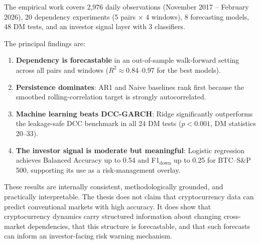 \documentclass[12pt, a4paper]{article}
\begin{document}
The empirical work covers 2{,}976 daily observations
(November 2017 – February 2026), 20 dependency experiments
(5 pairs $\times$ 4 windows), 8 forecasting models, 48 DM tests,
and an investor signal layer with 3 classifiers.

The principal findings are:

\begin{enumerate}
  \item \textbf{Dependency is forecastable} in an out-of-sample
    walk-forward setting across all pairs and windows
    ($R^2 \approx 0.84$–$0.97$ for the best models).
  \item \textbf{Persistence dominates}: AR1 and Naive baselines
    rank first because the smoothed rolling-correlation target
    is strongly autocorrelated.
  \item \textbf{Machine learning beats DCC-GARCH}:
    Ridge significantly outperforms the leakage-safe DCC benchmark
    in all 24 DM tests ($p < 0.001$, DM statistics 20–33).
  \item \textbf{The investor signal is moderate but meaningful}:
    Logistic regression achieves Balanced Accuracy up to 0.54
    and F1$_{\text{down}}$ up to 0.25 for BTC–S\&P 500,
    supporting its use as a risk-management overlay.
\end{enumerate}

These results are internally consistent, methodologically grounded,
and practically interpretable.
The thesis does not claim that cryptocurrency data can predict
conventional markets with high accuracy.
It does show that cryptocurrency dynamics carry structured
information about changing cross-market dependencies,
that this structure is forecastable, and that such forecasts
can inform an investor-facing risk warning mechanism.

\end{document}
